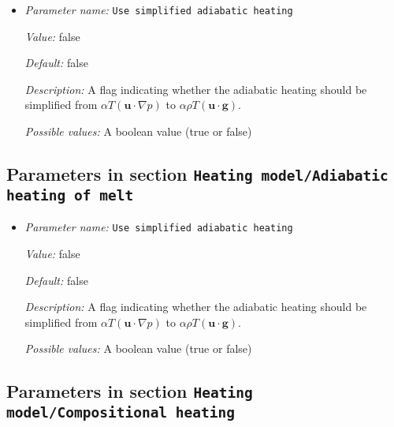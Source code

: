 \begin{itemize}
\item {\it Parameter name:} {\tt Use simplified adiabatic heating}
\label{parameters:Heating model/Adiabatic heating/Use simplified adiabatic heating}


{\it Value:} false


{\it Default:} false


{\it Description:} A flag indicating whether the adiabatic heating should be simplified from $\alpha T (\mathbf u \cdot \nabla p)$ to $ \alpha \rho T (\mathbf u \cdot \mathbf g) $.


{\it Possible values:} A boolean value (true or false)
\end{itemize}

\subsection{Parameters in section \tt Heating model/Adiabatic heating of melt}
\label{parameters:Heating_20model/Adiabatic_20heating_20of_20melt}

\begin{itemize}
\item {\it Parameter name:} {\tt Use simplified adiabatic heating}
\label{parameters:Heating model/Adiabatic heating of melt/Use simplified adiabatic heating}


{\it Value:} false


{\it Default:} false


{\it Description:} A flag indicating whether the adiabatic heating should be simplified from $\alpha T (\mathbf u \cdot \nabla p)$ to $ \alpha \rho T (\mathbf u \cdot \mathbf g) $.


{\it Possible values:} A boolean value (true or false)
\end{itemize}

\subsection{Parameters in section \tt Heating model/Compositional heating}
\label{parameters:Heating_20model/Compositional_20heating}

